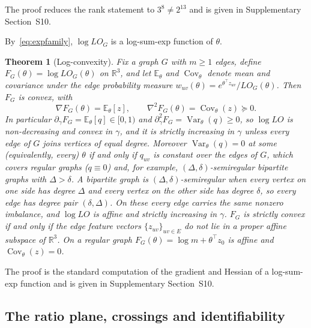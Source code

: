 \documentclass[a5paper, 10pt]{article}
\theoremstyle{plain}
\newtheorem{theorem}{Theorem}
\theoremstyle{remark}
\theoremstyle{definition}
\begin{document}
  The proof reduces the rank statement to $3^{8} \neq 2^{13}$ and is given
  in Supplementary Section~S10.

  By~\eqref{eq:expfamily}, $\log LO_G$ is a log-sum-exp function of
  $\theta$.

  \begin{theorem}[Log-convexity]\label{thm:logconvex}
  Fix a graph $G$ with $m \ge 1$ edges, define
  $F_G(\theta) = \log LO_G(\theta)$ on $\mathbb{R}^3$, and let
  $\mathbb{E}_{\theta}$ and $\operatorname{Cov}_{\theta}$ denote mean
  and covariance under the edge probability measure
  $w_{uv}(\theta) = e^{\theta^{\top} z_{uv}} / LO_G(\theta)$. Then
  $F_G$ is convex, with
  \begin{equation*}
  \nabla F_G(\theta) = \mathbb{E}_{\theta}[z], \qquad
  \nabla^2 F_G(\theta) = \operatorname{Cov}_{\theta}(z) \succeq 0 .
  \end{equation*}
  In particular
  $\partial_{\gamma} F_G = \mathbb{E}_{\theta}[q] \in [0, 1)$ and
  $\partial^2_{\gamma} F_G = \operatorname{Var}_{\theta}(q) \ge 0$, so
  $\log LO$ is non-decreasing and convex in $\gamma$, and it is strictly
  increasing in $\gamma$ unless every edge of $G$ joins vertices of
  equal degree. Moreover
  $\operatorname{Var}_{\theta}(q) = 0$ at some (equivalently, every)
  $\theta$ if and only if $q_{uv}$ is constant over the edges of $G$,
  which covers regular graphs ($q \equiv 0$) and, for example,
  $(\Delta,\delta)$-semiregular bipartite graphs with $\Delta > \delta$. A bipartite graph is
  $(\Delta,\delta)$-semiregular when every vertex on one side has
  degree $\Delta$ and every vertex on the other side has degree
  $\delta$, so every edge has degree pair $(\delta,\Delta)$. On these every edge carries the
  same nonzero imbalance, and $\log LO$ is affine and strictly
  increasing in $\gamma$. $F_G$ is strictly convex if and only if the
  edge feature vectors $\{z_{uv}\}_{uv \in E}$ do not lie in a proper
  affine subspace of $\mathbb{R}^3$. On a regular graph
  $F_G(\theta) = \log m + \theta^{\top} z_0$ is affine and
  $\operatorname{Cov}_{\theta}(z) = 0$.
  \end{theorem}

  The proof is the standard computation of the gradient and Hessian of a
  log-sum-exp function and is given in Supplementary Section~S10.


  \subsection{The ratio plane, crossings and identifiability}\label{sec:ratioplane}
\end{document}
